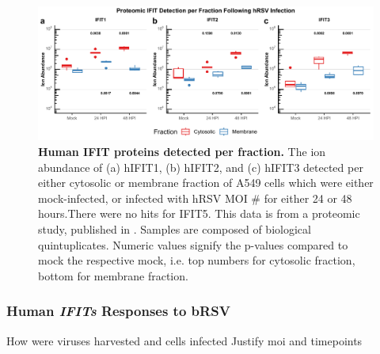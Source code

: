 \begin{figure}
    \centering
    \includegraphics[width=1\linewidth]{06. Chapter 1/Figs/01. Induction/13. merged_proteomics.pdf}
    \caption[Human IFIT proteins detected per fraction.]{\textbf{Human IFIT proteins detected per fraction.} The ion abundance of (a) hIFIT1, (b) hIFIT2, and (c) hIFIT3 detected per either cytosolic or membrane fraction of A549 cells which were either mock-infected, or infected with hRSV MOI # for either 24 or 48 hours.There were no hits for IFIT5. This data is from a proteomic study, published in \cite{Jobe2023ViralCondensates}. Samples are composed of biological quintuplicates. Numeric values signify the p-values compared to mock the respective mock, i.e. top numbers for cytosolic fraction, bottom for membrane fraction.}
    \label{Human IFIT proteomics.}
\end{figure}


\subsubsection{Human \textit{IFITs} Responses to bRSV} \label{Human IFITs Responses to bRSV}
How were viruses harvested and cells infected \newline
Justify moi and timepoints

